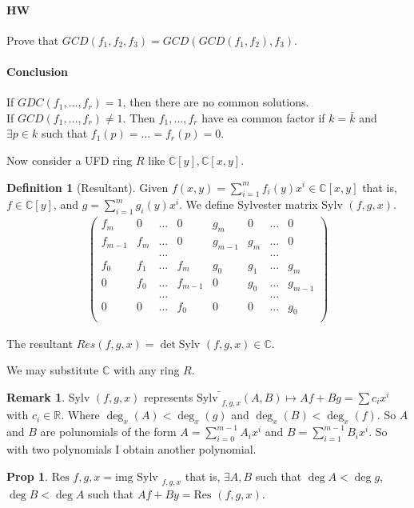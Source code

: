 \documentclass{article}
\theoremstyle{definition}
\newtheorem*{obs}{Remark}
\newtheorem*{prop}{Prop}
\newtheorem*{defn}{Definition}
\newcommand{\R}{\mathbb{R}}
\newcommand{\C}{\mathbb{C}}
\newcommand{\Res}{\text{Res }}
\newcommand{\img}{\text{img }}
\newcommand{\Sylv}{\text{Sylv }}
\begin{document}
\paragraph{HW}
	Prove that $GCD(f_1,f_2,f_3)=GCD(GCD(f_1,f_2),f_3)$.
\paragraph{Conclusion} If $GDC(f_1,...,f_r)=1$, then there are no common solutions.\\
If $GCD(f_1,...,f_r)\neq 1$. Then $f_1,...,f_r$ have ea common factor if $k=\bar k$ and $\exists p\in k$ such that $f_1(p)=...=f_r(p)=0$.\par

Now consider a UFD ring $R$ like $\C[y],\C[x,y]$.
\begin{defn}[Resultant]
	Given $f(x,y)=\sum_{i=1}^m f_i(y)x^i \in\C[x,y]$ that is, $f\in\C[y]$, and $g=\sum_{i=1}^m g_i(y)x^i$. We define Sylvester matrix $\text{Sylv }(f,g,x)$.\\
	\begin{align*}
		\begin{pmatrix}f_m&0&...&0&g_m&0&...&0\\ 
			f_{m-1}&f_{m}&...&0&g_{m-1}&g_{m}&...&0\\
      &&...&&&&...&\\
			f_0 & f_1&...&f_m&g_0 & g_1&...&g_m\\
			0&f_0&...&f_{m-1}&0&g_0&...&g_{m-1}\\
         &&...&&&&...&\\
   			0&0&...&f_0&0&0&...&g_0\\
		\end{pmatrix}
	\end{align*}\par
	The resultant $Res(f,g,x)=\det \text{Sylv }(f,g,x)\in \C$.
\end{defn}
We may substitute $\C$ with any ring $R$.
\begin{obs}
	$\text{Sylv }(f,g,x)$ represents $\bar{\text{Sylv }_{f,g,x}}(A,B)\mapsto Af+Bg=\sum c_ix^i$ with $c_i\in\R$. Where $\deg_x(A)<\deg_x(g)$ and $\deg_x(B)<\deg_x(f)$. So $A$ and $B$ are polunomials of the form $A=\sum_{i=0}^{m-1}A_ix^i$ and $B=\sum_{i=1}^{m-1}B_ix^i$.  So with two polynomials I obtain another polynomial.
\end{obs}
\begin{prop}
	$\Res{f,g,x}=\img \Sylv _{f,g,x}$ that is, $\exists A,B$ such that $\deg A<\deg g$, $\deg B<\deg A$ such that $Af+By=\Res (f,g,x)$.
\end{prop}
\end{document}
